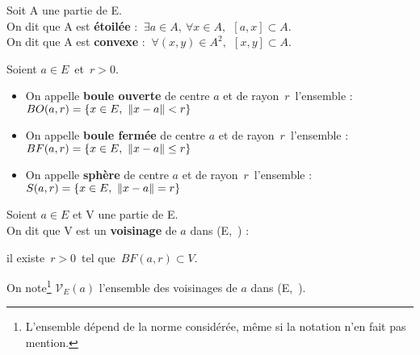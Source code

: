 \vspace{1.3cm}

Soit A une partie de E. \vspace{0.1cm}\\
On dit que A est \textbf{étoilée} \ssi : \(\ \exists a\in A,\ \forall x\in A,\ \ [a,x]\subset A. \) \vspace{0.2cm} \\
On dit que A est \textbf{convexe} \ssi : \(\ \forall(x,y)\in A^2,\ \ [x,y]\subset A. \)

\newpage

Soient \(a\in E\,\) et \(\,r>0\).
\begin{itemize}[leftmargin=0.3cm, label=•]
    \item On appelle \textbf{boule ouverte} de centre \(a\) et de rayon \(\,r\,\) l'ensemble : \(BO(a,r)=\{ x\in E,\ \norm{x-a}< r\}  \)\vspace{0.1cm}

    \item On appelle \textbf{boule fermée} de centre \(a\) et de rayon \(\,r\,\) l'ensemble : \(BF(a,r)=\{ x\in E,\ \norm{x-a}\leq r\}  \)\vspace{0.1cm}

    \item On appelle \textbf{sphère} de centre \(a\) et de rayon \(\,r\,\) l'ensemble : \(S(a,r)=\{ x\in E,\ \left\lVert x-a\right\rVert= r\}  \)
\end{itemize}

\vspace{1.3cm}

Soient \(a\in E\) et V une partie de E.\vspace{0.1cm}\\
On dit que V est un \textbf{voisinage} de $a$ dans (E,\ \normtxt{\ }) \ssi :\vspace{0.15cm}

\hspace{5cm} il existe $\,r>0\,$ tel que \(\,BF(a,r)\subset V\).\vspace{0.4cm}

\noindent \begin{small}On note\footnote{L'ensemble dépend de la norme considérée, même si la notation n'en fait pas mention.} \(\mathcal{V}_E(a)\) l'ensemble des voisinages de $a$ dans (E,\ \normtxt{\ }).\end{small}

\vspace{0.7cm}

